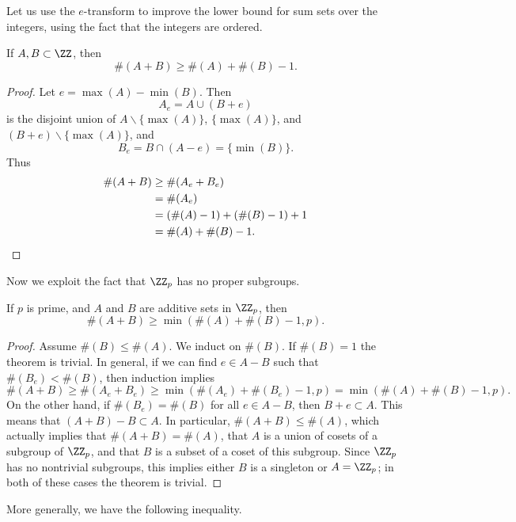 Let us use the $e$-transform to improve the lower bound for sum sets over the integers, using the fact that the integers are ordered.

\begin{lemma}
    If $A,B \subset \ZZ$, then
    \[ \#(A + B) \geq \#(A) + \#(B) - 1. \]
\end{lemma}
\begin{proof}
    Let $e = \max(A) - \min(B)$. Then
    \[ A_e = A \cup (B + e) \]
    is the disjoint union of $A \smallsetminus \{ \max(A) \}$, $\{ \max(A) \}$, and $(B + e) \smallsetminus \{ \max(A) \}$, and
    \[ B_e = B \cap (A - e) = \{ \min(B) \}. \]
    Thus
    \begin{align*}
        \#(A + B) &\geq \#(A_e + B_e)\\
        &= \#(A_e)\\
        &= (\#(A) - 1) + (\#(B) - 1) + 1\\
        &= \#(A) + \#(B) - 1. \qedhere
    \end{align*}
\end{proof}

Now we exploit the fact that $\ZZ_p$ has no proper subgroups.

\begin{lemma}
    If $p$ is prime, and $A$ and $B$ are additive sets in $\ZZ_p$, then
    \[ \#(A + B) \geq \min(\#(A) + \#(B) - 1, p). \]
\end{lemma}
\begin{proof}
    Assume $\#(B) \leq \#(A)$. We induct on $\#(B)$. If $\#(B) = 1$ the theorem is trivial. In general, if we can find $e \in A - B$ such that $\#(B_e) < \#(B)$, then induction implies
    \[ \#(A + B) \geq \#(A_e + B_e) \geq \min(\#(A_e) + \#(B_e) - 1, p) = \min(\#(A) + \#(B) - 1, p). \]
    On the other hand, if $\#(B_e) = \#(B)$ for all $e \in A - B$, then $B + e \subset A$. This means that $(A + B) - B \subset A$. In particular, $\#(A + B) \leq \#(A)$, which actually implies that $\#(A + B) = \#(A)$, that $A$ is a union of cosets of a subgroup of $\ZZ_p$, and that $B$ is a subset of a coset of this subgroup. Since $\ZZ_p$ has no nontrivial subgroups, this implies either $B$ is a singleton or $A = \ZZ_p$; in both of these cases the theorem is trivial.
\end{proof}

More generally, we have the following inequality.


